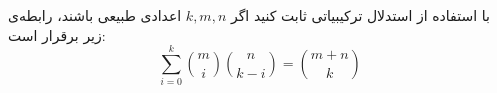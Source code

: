 \EXERCISE
با استفاده از استدلال ترکیبیاتی ثابت کنید اگر
$k, m, n$
اعدادی طبیعی باشند، رابطه‌ی زیر برقرار است:
$$\sum_{i=0}^{k} \binom{m}{i} \binom{n}{k-i} = \binom{m+n}{k}$$